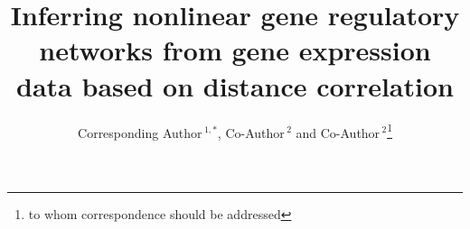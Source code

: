 \documentclass{bioinfo}
\begin{document}

\title[short Title]{Inferring nonlinear gene regulatory networks from gene expression data based on distance correlation}
\author[Sample \textit{et~al}]{Corresponding Author\,$^{1,*}$, Co-Author\,$^{2}$ and Co-Author\,$^2$\footnote{to whom correspondence should be addressed}}
\address{$^{1}$Department of XXXXXXX, Address XXXX etc.\\
$^{2}$Department of XXXXXXXX, Address XXXX etc.}



\maketitle
\end{document}
